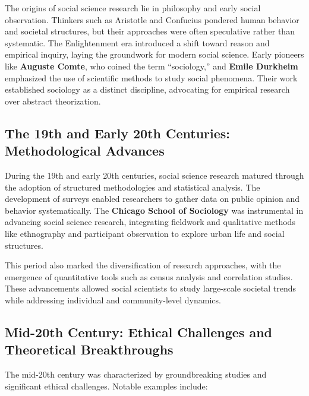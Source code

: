 \documentclass[
]{book}
\begin{document}
The origins of social science research lie in philosophy and early social observation. Thinkers such as Aristotle and Confucius pondered human behavior and societal structures, but their approaches were often speculative rather than systematic. The Enlightenment era introduced a shift toward reason and empirical inquiry, laying the groundwork for modern social science. Early pioneers like \textbf{Auguste Comte}, who coined the term ``sociology,'' and \textbf{Emile Durkheim} emphasized the use of scientific methods to study social phenomena. Their work established sociology as a distinct discipline, advocating for empirical research over abstract theorization.

\subsection*{The 19th and Early 20th Centuries: Methodological Advances}\label{the-19th-and-early-20th-centuries-methodological-advances}

During the 19th and early 20th centuries, social science research matured through the adoption of structured methodologies and statistical analysis. The development of surveys enabled researchers to gather data on public opinion and behavior systematically. The \textbf{Chicago School of Sociology} was instrumental in advancing social science research, integrating fieldwork and qualitative methods like ethnography and participant observation to explore urban life and social structures.

This period also marked the diversification of research approaches, with the emergence of quantitative tools such as census analysis and correlation studies. These advancements allowed social scientists to study large-scale societal trends while addressing individual and community-level dynamics.

\subsection*{Mid-20th Century: Ethical Challenges and Theoretical Breakthroughs}\label{mid-20th-century-ethical-challenges-and-theoretical-breakthroughs}

The mid-20th century was characterized by groundbreaking studies and significant ethical challenges. Notable examples include:
\end{document}
